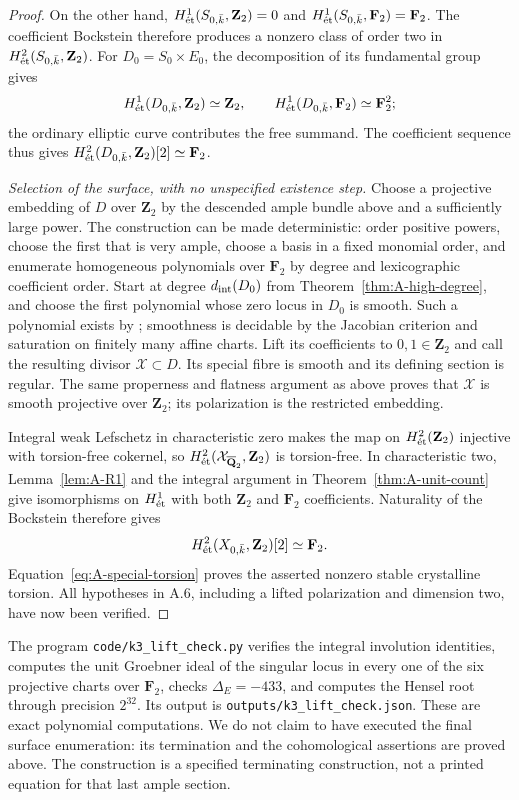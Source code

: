 \begin{proof}
On the other hand,
$H^1_{\et}(S_{0,\bar k},\mathbf Z_2)=0$ and
$H^1_{\et}(S_{0,\bar k},\mathbf F_2)=\mathbf F_2$.
The coefficient Bockstein therefore produces a nonzero class of
order two in $H^2_{\et}(S_{0,\bar k},\mathbf Z_2)$.
For $D_0=S_0\times E_0$, the decomposition of its fundamental group
gives
\[
 H^1_{\et}(D_{0,\bar k},\mathbf Z_2)\simeq\mathbf Z_2,
 \qquad H^1_{\et}(D_{0,\bar k},\mathbf F_2)\simeq\mathbf F_2^2;
\]
the ordinary elliptic curve contributes the free summand.  The
coefficient sequence thus gives
$H^2_{\et}(D_{0,\bar k},\mathbf Z_2)[2]\simeq\mathbf F_2$.

\emph{Selection of the surface, with no unspecified existence step.}
Choose a projective embedding of $D$ over $\mathbf Z_2$ by the
descended ample bundle above and a sufficiently large power.  The
construction can be made deterministic: order positive powers,
choose the first that is very ample, choose a basis in a fixed
monomial order, and enumerate homogeneous polynomials over
$\mathbf F_2$ by degree and lexicographic coefficient order.
Start at degree $d_{\rm int}(D_0)$ from
Theorem~\ref{thm:A-high-degree}, and choose the first polynomial
whose zero locus in $D_0$ is smooth.  Such a polynomial exists by
\citet[Theorem 1.1]{Poonen2004}; smoothness is decidable by the
Jacobian criterion and saturation on finitely many affine charts.
Lift its coefficients to $0,1\in\mathbf Z_2$ and call the resulting
divisor $\mathcal X\subset D$.  Its special fibre is smooth and its
defining section is regular.  The same properness and flatness
argument as above proves that $\mathcal X$ is smooth projective over
$\mathbf Z_2$; its polarization is the restricted embedding.

Integral weak Lefschetz in characteristic zero makes the map on
$H^2_{\et}(\mathbf Z_2)$ injective with torsion-free cokernel, so
$H^2_{\et}(\mathcal X_{\overline{\mathbf Q}_2},\mathbf Z_2)$ is
torsion-free.  In characteristic two,
Lemma~\ref{lem:A-R1} and the integral argument in
Theorem~\ref{thm:A-unit-count} give isomorphisms on $H^1_{\et}$ with
both $\mathbf Z_2$ and $\mathbf F_2$ coefficients.  Naturality of the
Bockstein therefore gives
\[
H^2_{\et}(X_{0,\bar k},\mathbf Z_2)[2]\simeq\mathbf F_2.
\]
Equation~\eqref{eq:A-special-torsion} proves the asserted nonzero
stable crystalline torsion.  All hypotheses in A.6, including a
lifted polarization and dimension two, have now been verified.
\end{proof}

\begin{remark}\label{rem:A-K3-computation}
The program \texttt{code/k3\_lift\_check.py} verifies the integral
involution identities, computes the unit Groebner ideal of the
singular locus in every one of the six projective charts over
$\mathbf F_2$, checks $\Delta_E=-433$, and computes the Hensel root
through precision $2^{32}$.  Its output is
\texttt{outputs/k3\_lift\_check.json}.  These are exact polynomial
computations.  We do not claim to have executed the final surface
enumeration: its termination and the cohomological assertions are
proved above.  The construction is a specified terminating
construction, not a printed equation for that last ample section.
\end{remark}

